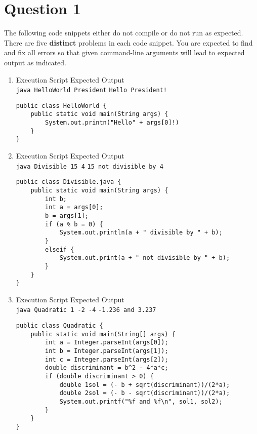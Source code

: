 \documentclass[12pt,letterpaper,twoside]{article}
\begin{document}


\section*{Question 1}

The following code snippets either do not compile or do not run as expected. There are five \textbf{distinct} problems in each code snippet. You are expected to find and fix all errors so that given command-line arguments will lead to expected output as indicated.
\begin{enumerate}[label=\textbf{(\alph*)}]
\item Execution Script \hfill Expected Output\\
\texttt{java HelloWorld President} \hfill \texttt{Hello President!}
\begin{lstlisting}
public class HelloWorld {
	public static void main(String args) {
		System.out.printn("Hello" + args[0]!)
	}
}
\end{lstlisting}

\item Execution Script \hfill Expected Output\\
\texttt{java Divisible 15 4} \hfill \texttt{15 not divisible by 4}

\begin{lstlisting}
public class Divisible.java {
	public static void main(String args) {
		int b;
		int a = args[0];
		b = args[1];
		if (a % b = 0) {
			System.out.println(a + " divisible by " + b);
		}
		elseif {
			System.out.print(a + " not divisible by " + b);
		}
	}
}
\end{lstlisting}

\item Execution Script \hfill Expected Output\\
\texttt{java Quadratic 1 -2 -4} \hfill \texttt{-1.236 and 3.237}

\begin{lstlisting}
public class Quadratic {
	public static void main(String[] args) {
		int a = Integer.parseInt(args[0]);
		int b = Integer.parseInt(args[1]);
		int c = Integer.parseInt(args[2]);
		double discriminant = b^2 - 4*a*c;
		if (double discriminant > 0) {
			double 1sol = (- b + sqrt(discriminant))/(2*a);
			double 2sol = (- b - sqrt(discriminant))/(2*a);
			System.out.printf("%f and %f\n", sol1, sol2);
		}
	}
}
\end{lstlisting}


\end{enumerate}
\end{document}
